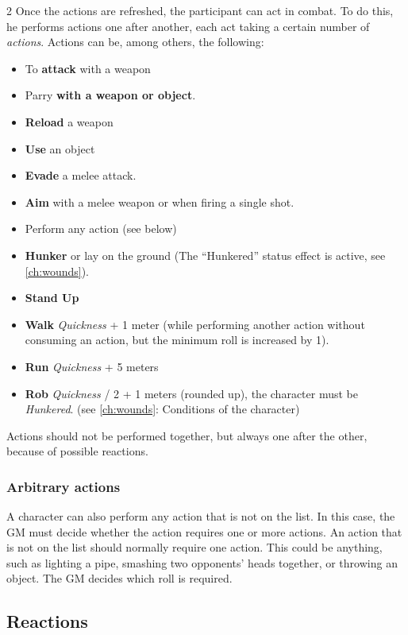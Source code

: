 \begin{multicols}{2}
Once the actions are refreshed, the participant can act in combat. To do this, he performs actions one after another, each act taking a certain number of \textit{actions}. Actions can be, among others, the following:
\begin{itemize}
    \item To \textbf{attack} with a weapon
    \item Parry \textbf{with a weapon or object}.
    \item \textbf{Reload} a weapon
    \item \textbf{Use} an object
    \item \textbf{Evade} a melee attack.
    \item \textbf{Aim} with a melee weapon or when firing a single shot.
    \item Perform any action (see below)
    \item \textbf{Hunker} or lay on the ground (The ``Hunkered'' status effect is active, see \cref{ch:wounds}).
    \item \textbf{Stand Up}
    \item \textbf{Walk} \textit{Quickness} + 1 meter (while performing another action without consuming an action, but the minimum roll is increased by 1).
    \item \textbf{Run} \textit{Quickness} + 5 meters
    \item \textbf{Rob} \textit{Quickness} / 2 + 1 meters (rounded up), the character must be \textit{Hunkered}. (see \cref{ch:wounds}: Conditions of the character)
\end{itemize}

Actions should not be performed together, but always one after the other, because of possible reactions.

\subsubsection{Arbitrary actions}

A character can also perform any action that is not on the list. In this case, the GM must decide whether the action requires one or more actions. An action that is not on the list should normally require one action. This could be anything, such as lighting a pipe, smashing two opponents' heads together, or throwing an object. The GM decides which roll is required.

\subsection{Reactions}


\end{multicols}
